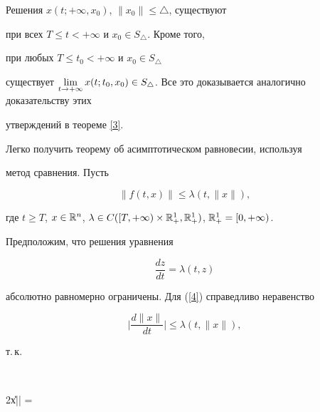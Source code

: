 \begin{pf}


Решения $x(t;+\infty,x_{0})$, $\|x_{0}\| \leq \triangle$, существуют


при всех $T\leq t<+\infty$ и $x_{0}\in S_{\triangle} $. Кроме того,


при любых $T\leq t_{0}<+\infty$ и $x_{0}\in S_{\triangle}$


существует $\lim \limits_{t\rar +\infty}x(t;t_{0},x_{0}) \in


S_{\triangle}$. Все это доказывается аналогично доказательству этих


утверждений в теореме \ref{3}.


\end{pf}





Легко получить теорему об асимптотическом равновесии, используя


метод сравнения. Пусть


\begin{equation}


\label{3}


\|f(t,x)\| \leq \lambda (t,\|x\|),


\end{equation}


где $t \geq T$, $x\in \R^{n}$, $\lambda \in C([T,+\infty)


\times \R_{+}^{1},\R_{+}^{1})$, $\R_{+}^{1}=[0,+\infty)$.


Предположим, что решения уравнения 


\begin{equation}


\label{4}


\frac{dz}{dt}= \lambda (t,z)


\end{equation}


абсолютно равномерно ограничены. Для (\ref{4}) справедливо неравенство


\begin{equation}


\label{5}


\bigg|\frac{d\|x\|}{dt}\bigg|\leq \lambda (t,\|x\|),


\end{equation}


т.\,к.


$$


2\|x\|\bigg|\bigg| =\bigg


